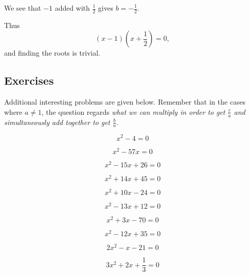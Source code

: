 \documentclass[a4paper]{article}
\begin{document}
We see that $-1$ added with $\frac{1}{2}$ gives $b=-\frac{1}{2}$.

Thus
\begin{equation} \label{eq:ex51}
 (x-1)(x+\frac{1}{2}) = 0,
\end{equation}
and finding the roots is trivial.

\newpage

\subsection{Exercises}

Additional interesting problems are given below. Remember that in the cases where $a \neq 1$, the question regards \emph{what we can multiply in order to get $\frac{c}{a}$ and simultaneously add together to get $\frac{b}{a}$}.


\begin{equation}
	x^2 - 4 = 0
\end{equation}

\begin{equation}
	x^2 - 57x = 0
\end{equation}

\begin{equation}
	x^2 - 15x +26 = 0
\end{equation}

\begin{equation}
	x^2 + 14x +45 = 0
\end{equation}

\begin{equation}
	x^2 + 10x -24 = 0
\end{equation}

\begin{equation}
	x^2 - 13x +12 = 0
\end{equation}

\begin{equation}
	x^2 + 3x -70 = 0
\end{equation}

\begin{equation}
	x^2 -12x +35 = 0
\end{equation}

\begin{equation}
	2x^2 -x -21 = 0
\end{equation}

\begin{equation}  \label{eq:ex5}
	3x^2 + 2x + \frac{1}{3} = 0
\end{equation}
\end{document}
